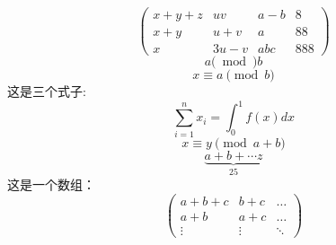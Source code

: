 \documentclass[UTF8]{ctexart}
\begin{document}
\begin{displaymath}
\left(\begin{array}{clcr}
x+y+z & uv    & a-b & 8 \\
x+y   & u+v   & a   & 88\\
x     & 3u-v & abc & 888 
\end{array}\right)
\end{displaymath}
$$a(\bmod)b$$
$$x\equiv a \pmod{b}$$
这是三个式子:
$$\sum_{i=1}^{n}x_i = \int\nolimits_{0}^{1}f(x)dx$$
$$x\equiv y \pmod{a+b}$$
$$\underbrace{a+b+\cdots z}_{25}$$
这是一个数组：
\begin{displaymath}
\left(\begin{array}{ccc}
a+b+c & b+c    & \ldots \\
a+b   & a+c   & \ldots\\
\vdots     & \vdots & \ddots 
\end{array}\right)
\end{displaymath}
\end{document}
